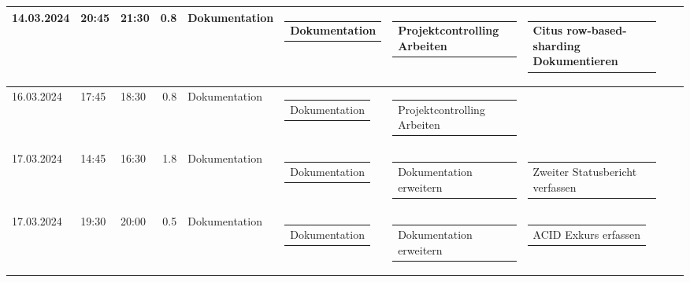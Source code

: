 {\begin{longtable}[H]{lllrllllll}
14.03.2024 & 20:45 & 21:30 & 0.8 & Dokumentation & \begin{tabular}[c]{@{}l@{}}Dokumentation\end{tabular} & \begin{tabular}[c]{@{}l@{}}Projektcontrolling Arbeiten\end{tabular} & \begin{tabular}[c]{@{}l@{}}Citus row-based-sharding Dokumentieren\end{tabular} & \begin{tabular}[c]{@{}l@{}}\end{tabular} & \begin{tabular}[c]{@{}l@{}}\end{tabular} \\ \midrule
16.03.2024 & 17:45 & 18:30 & 0.8 & Dokumentation & \begin{tabular}[c]{@{}l@{}}Dokumentation\end{tabular} & \begin{tabular}[c]{@{}l@{}}Projektcontrolling Arbeiten\end{tabular} & \begin{tabular}[c]{@{}l@{}}\end{tabular} & \begin{tabular}[c]{@{}l@{}}\end{tabular} & \begin{tabular}[c]{@{}l@{}}\end{tabular} \\ \midrule
17.03.2024 & 14:45 & 16:30 & 1.8 & Dokumentation & \begin{tabular}[c]{@{}l@{}}Dokumentation\end{tabular} & \begin{tabular}[c]{@{}l@{}}Dokumentation erweitern\end{tabular} & \begin{tabular}[c]{@{}l@{}}Zweiter Statusbericht verfassen\end{tabular} & \begin{tabular}[c]{@{}l@{}}\end{tabular} & \begin{tabular}[c]{@{}l@{}}\end{tabular} \\ \midrule
17.03.2024 & 19:30 & 20:00 & 0.5 & Dokumentation & \begin{tabular}[c]{@{}l@{}}Dokumentation\end{tabular} & \begin{tabular}[c]{@{}l@{}}Dokumentation erweitern\end{tabular} & \begin{tabular}[c]{@{}l@{}}ACID Exkurs erfassen\end{tabular} & \begin{tabular}[c]{@{}l@{}}\end{tabular} & \begin{tabular}[c]{@{}l@{}}\end{tabular} \\ \midrule

\end{longtable}}
